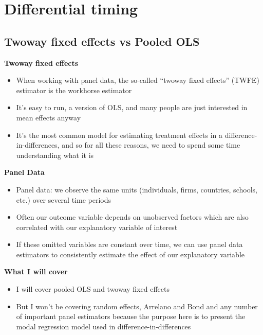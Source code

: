 \documentclass{beamer}
\begin{document}



\section{Differential timing}
\subsection{Twoway fixed effects vs Pooled OLS}


\begin{frame}
\begin{center}
\textbf{Twoway fixed effects}
\end{center}

\begin{itemize}
\item When working with panel data, the so-called ``twoway fixed effects'' (TWFE) estimator is the workhorse estimator
\item It's easy to run, a version of OLS, and many people are just interested in mean effects anyway
\item It's the most common model for estimating treatment effects in a difference-in-differences, and so for all these reasons, we need to spend some time understanding what it is
\end{itemize}

\end{frame}


\begin{frame}[plain]
	\begin{center}
	\textbf{Panel Data}
	\end{center}
	
	\begin{itemize}
	\item Panel data: we observe the same units (individuals, firms, countries, schools, etc.) over several time periods
	\item Often our outcome variable depends on unobserved factors which are also correlated with our explanatory variable of interest
	\item If these omitted variables are constant over time, we can use panel data estimators to consistently estimate the effect of our explanatory variable
	\end{itemize}
\end{frame}

\begin{frame}[plain]
\begin{center}
\textbf{What I will cover}
\end{center}

\begin{itemize}
		\item I will cover pooled OLS and twoway fixed effects
		\item But I won't be covering random effects, Arrelano and Bond and any number of important panel estimators because the purpose here is to present the modal regression model used in difference-in-differences
\end{itemize}

\end{frame}
\end{document}
